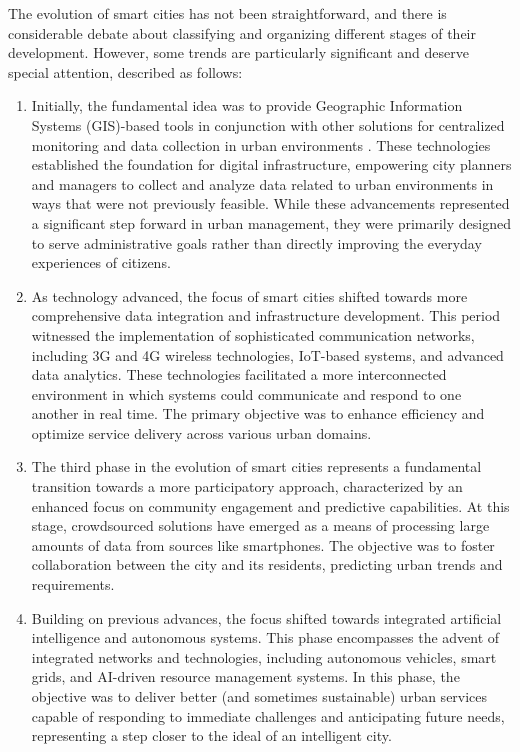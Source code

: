 \documentclass[smartcities,article,submit,pdftex,moreauthors]{Definitions/mdpi}
\begin{document}
The evolution of smart cities has not been straightforward, and there is considerable debate about classifying and organizing different stages of their development. However, some trends are particularly significant and deserve special attention, described as follows:

\begin{enumerate}
    \item Initially, the fundamental idea was to provide Geographic Information Systems (GIS)-based tools in conjunction with other solutions for centralized monitoring and data collection in urban environments \cite{costaAchievingSustainableSmart2024}. These technologies established the foundation for digital infrastructure, empowering city planners and managers to collect and analyze data related to urban environments in ways that were not previously feasible. While these advancements represented a significant step forward in urban management, they were primarily designed to serve administrative goals rather than directly improving the everyday experiences of citizens.

    \item As technology advanced, the focus of smart cities shifted towards more comprehensive data integration and infrastructure development. This period witnessed the implementation of sophisticated communication networks, including 3G and 4G wireless technologies, IoT-based systems, and advanced data analytics. These technologies facilitated a more interconnected environment in which systems could communicate and respond to one another in real time. The primary objective was to enhance efficiency and optimize service delivery across various urban domains.

    \item The third phase in the evolution of smart cities represents a fundamental transition towards a more participatory approach, characterized by an enhanced focus on community engagement and predictive capabilities. At this stage, crowdsourced solutions have emerged as a means of processing large amounts of data from sources like smartphones. The objective was to foster collaboration between the city and its residents, predicting urban trends and requirements. 

    \item Building on previous advances, the focus shifted towards integrated artificial intelligence and autonomous systems. This phase encompasses the advent of integrated networks and technologies, including autonomous vehicles, smart grids, and AI-driven resource management systems. In this phase, the objective was to deliver better (and sometimes sustainable) urban services capable of responding to immediate challenges and anticipating future needs, representing a step closer to the ideal of an intelligent city. 


\end{enumerate}
\end{document}
